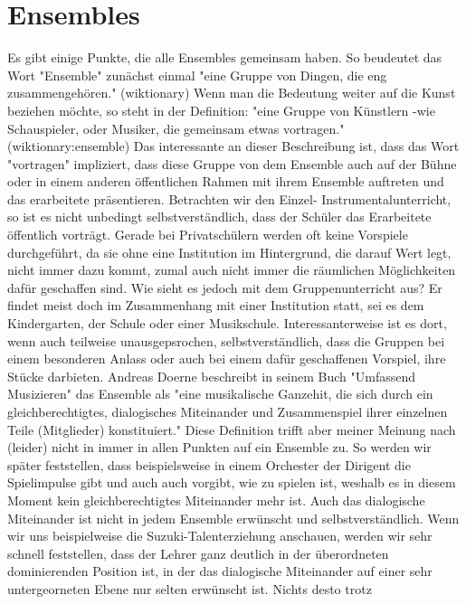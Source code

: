 \section{Ensembles}

Es gibt einige Punkte, die alle Ensembles gemeinsam haben. So beudeutet das Wort
"Ensemble" zunächst einmal "eine Gruppe von Dingen, die eng
zusammengehören." (wiktionary) Wenn man die Bedeutung weiter auf die Kunst
beziehen möchte, so steht in der Definition: "eine Gruppe von Künstlern -wie
Schauspieler, oder Musiker, die gemeinsam etwas vortragen."
(wiktionary:ensemble) Das interessante an dieser Beschreibung ist, dass das Wort
"vortragen" impliziert, dass diese Gruppe von dem Ensemble auch auf der Bühne
oder in einem anderen öffentlichen Rahmen mit ihrem Ensemble auftreten und das
erarbeitete präsentieren. Betrachten wir den Einzel- Instrumentalunterricht, so
ist es nicht unbedingt selbstverständlich, dass der Schüler das Erarbeitete
öffentlich vorträgt. Gerade bei Privatschülern werden oft keine Vorspiele
durchgeführt, da sie ohne eine Institution im Hintergrund, die darauf Wert legt,
nicht immer dazu kommt, zumal auch nicht immer die räumlichen Möglichkeiten dafür
geschaffen sind. Wie sieht es jedoch mit dem Gruppenunterricht aus? Er findet
meist doch im Zusammenhang mit einer Institution statt, sei es dem Kindergarten, der
Schule oder einer Musikschule. Interessanterweise ist es dort, wenn auch
teilweise unausgepsrochen, selbstverständlich, dass die Gruppen bei einem
besonderen Anlass oder auch bei einem dafür geschaffenen Vorspiel, ihre Stücke
darbieten. 
Andreas Doerne beschreibt in seinem Buch "Umfassend Musizieren" das Ensemble als
"eine musikalische Ganzehit, die sich
durch ein gleichberechtigtes, dialogisches Miteinander und Zusammenspiel ihrer
einzelnen Teile (Mitglieder) konstituiert."
\autocite[62]{doerne:umfassend_musizieren} Diese Definition trifft aber meiner
Meinung nach (leider) nicht in immer in allen Punkten auf ein Ensemble zu. So
werden wir später feststellen, dass beispielsweise in einem Orchester der
Dirigent die Spielimpulse gibt und auch auch vorgibt, wie zu spielen ist,
weshalb es in diesem Moment kein gleichberechtigtes Miteinander mehr ist. Auch
das dialogische Miteinander ist nicht in jedem Ensemble erwünscht und
selbstverständlich. Wenn wir uns beispielweise die Suzuki-Talenterziehung
anschauen, werden wir sehr schnell feststellen, dass der Lehrer ganz deutlich in
der überordneten dominierenden Position ist, in der das dialogische Miteinander
auf einer sehr untergeorneten Ebene nur selten erwünscht ist. Nichts desto trotz
